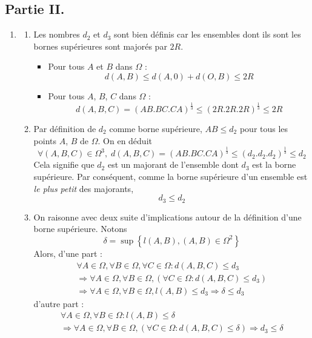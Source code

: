 \subsection*{Partie II.}
\begin{enumerate}
 \item \begin{enumerate}
 \item Les nombres $d_2$ et $d_3$ sont bien définis car les ensembles dont ils sont les bornes supérieures sont majorés par $2R$.
\begin{itemize}
 \item Pour tous $A$ et $B$ dans $\Omega$ : 
\begin{displaymath}
 d(A,B)\leq d(A,0)+d(O,B)\leq 2R
\end{displaymath}

 \item Pour tous $A$,  $B$, $C$ dans $\Omega$ : 
\begin{displaymath}
d(A,B,C)=(AB.BC.CA)^{\frac{1}{3}} \leq (2R.2R.2R)^{\frac{1}{3}}\leq 2R 
\end{displaymath}
\end{itemize}

\item Par définition de $d_2$ comme borne supérieure, $AB\leq d_2$ pour tous les points $A$, $B$ de $\Omega$. On en déduit 
\begin{displaymath}
\forall (A,B,C)\in \Omega^3,\; d(A,B,C)=(AB.BC.CA)^{\frac{1}{3}} \leq (d_2.d_2.d_2)^{\frac{1}{3}}\leq d_2 
\end{displaymath}
Cela signifie que $d_2$ est un majorant de l'ensemble dont $d_3$ est la borne supérieure. Par conséquent, comme la borne supérieure d'un ensemble est \emph{le plus petit} des majorants,
\begin{displaymath}
 d_3\leq d_2
\end{displaymath}

\item On raisonne avec deux suite d'implications autour de la définition d'une borne supérieure. Notons
\begin{displaymath}
 \delta = \sup \left\lbrace l(A,B), (A,B)\in \Omega^2 \right\rbrace 
\end{displaymath}
Alors, d'une part :
\begin{multline*}
 \forall A \in \Omega, \forall B \in \Omega, \forall C \in \Omega : d(A,B,C)\leq d_3 \\
\Rightarrow \forall A \in \Omega, \forall B \in \Omega, \left( \forall C \in \Omega : d(A,B,C)\leq d_3 \right) \\
\Rightarrow \forall A \in \Omega, \forall B \in \Omega, l(A,B)\leq d_3
\Rightarrow \delta \leq d_3
\end{multline*}
d'autre part :
\begin{multline*}
 \forall A \in \Omega, \forall B \in \Omega : l(A,B)\leq \delta \\
\Rightarrow \forall A \in \Omega, \forall B \in \Omega, \left( \forall C \in \Omega : d(A,B,C)\leq \delta \right)
\Rightarrow d_3 \leq \delta
\end{multline*}
\end{enumerate}


\end{enumerate}
